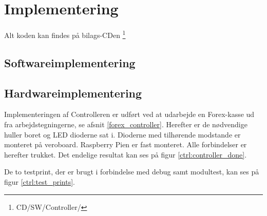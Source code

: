 \section{Implementering}

Alt koden kan findes på bilags-CDen \citep{cd}\footnote{CD/SW/Controller/}

\subsection{Softwareimplementering}


\subsection{Hardwareimplementering}

Implementeringen af Controlleren er udført ved at udarbejde en Forex-kasse ud fra arbejdstegningerne, se afsnit \ref{forex_controller}. Herefter er de nødvendige huller boret og LED dioderne sat i. Dioderne med tilhørende modstande er monteret på veroboard. Raspberry Pien er fast monteret. Alle forbindelser er herefter trukket.
Det endelige resultat kan ses på figur \ref{ctrl:controller_done}.


De to testprint, der er brugt i forbindelse med debug samt modultest, kan ses på figur \ref{ctrl:test_prints}.

